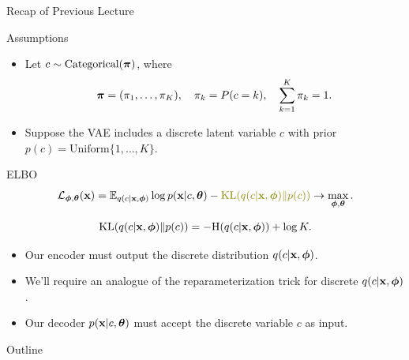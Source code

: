 \documentclass{beamer}
\begin{document}
\begin{frame}{Recap of Previous Lecture}
	\begin{block}{Assumptions}
		\begin{itemize}
			\item Let $c \sim \mathrm{Categorical}(\boldsymbol{\pi})$, where 
			\vspace{-0.6cm}
			\[
			\boldsymbol{\pi} = (\pi_1, \dots, \pi_K), \quad \pi_k = P(c = k), \quad \sum_{k=1}^K \pi_k = 1.
			\]
			\vspace{-0.7cm}
			\item Suppose the VAE includes a discrete latent variable $c$ with prior $p(c) = \text{Uniform}\{1, \dots, K\}$.
		\end{itemize}
	\end{block}
	\begin{block}{ELBO}
		\vspace{-0.6cm}
		\[
			\cL_{\bphi, \btheta}(\bx)  = \bbE_{q(c | \bx, \bphi)} \log p(\bx | c, \btheta) - {\color{olive} \KL(q(c| \bx, \bphi) \| p(c))} \rightarrow \max_{\bphi, \btheta}.
		\]
	\end{block}
	\vspace{-1.0cm}
	\[
		\mathrm{KL}(q(c| \mathbf{x}, \boldsymbol{\phi}) \| p(c)) = - \mathrm{H}(q(c | \mathbf{x}, \boldsymbol{\phi})) + \log K. 
	\]		
	\vspace{-0.5cm}
	\begin{itemize}
		\item Our encoder must output the discrete distribution $q(c | \mathbf{x}, \boldsymbol{\phi})$.
		\item We'll require an analogue of the reparameterization trick for discrete $q(c | \mathbf{x}, \boldsymbol{\phi})$.
		\item Our decoder $p(\mathbf{x} | c, \boldsymbol{\theta})$ must accept the discrete variable $c$ as input.
	\end{itemize}
\end{frame}
\begin{frame}{Outline}
	\tableofcontents
\end{frame}
\end{document}
